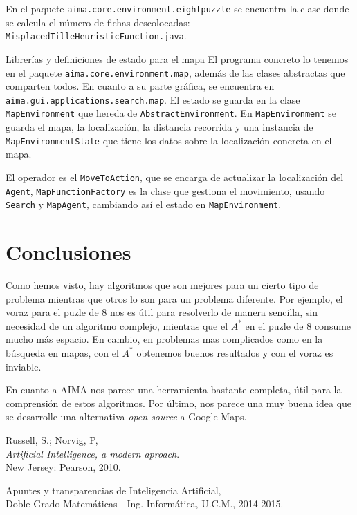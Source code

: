 \documentclass[11pt, a4paper, spanish, openright, twoside]{book}
\begin{document}
En el paquete \texttt{aima.core.environment.eightpuzzle} se encuentra la clase donde se calcula el número de fichas descolocadas: \texttt{MisplacedTilleHeuristicFunction.java}.



\begin{section}{Librerías y definiciones de estado para el mapa }
	El programa concreto lo tenemos en el paquete \texttt{aima.core.environment.map}, además de las clases abstractas que comparten todos. En cuanto a su parte gráfica, se encuentra en \texttt{aima.gui.applications.search.map}. El estado se guarda en la clase 
	\texttt{MapEnvironment} que hereda de \texttt{AbstractEnvironment}. En \texttt{MapEnvironment} se guarda el mapa, la localización, la distancia recorrida y una instancia de \texttt{MapEnvironmentState} que tiene los datos sobre la localización concreta en el mapa.
	
	El operador es el \texttt{MoveToAction}, que se encarga de actualizar la localización del \texttt{Agent}, \texttt{MapFunctionFactory} es la clase que gestiona el movimiento, usando \texttt{Search} y \texttt{MapAgent}, cambiando así el estado en \texttt{MapEnvironment}.

\end{section}

	
\section{Conclusiones}

Como hemos visto, hay algoritmos que son mejores para un cierto tipo de problema mientras que otros lo son para un problema diferente. Por ejemplo, el voraz para el puzle de 8 nos es útil para resolverlo de manera sencilla, sin necesidad de un algoritmo complejo, mientras que el $A^*$ en el puzle de 8 consume mucho más espacio. En cambio, en problemas mas complicados como en la búsqueda en mapas, con el $A^*$ obtenemos buenos resultados y con el voraz es inviable.

En cuanto a AIMA nos parece una herramienta bastante completa, útil para la comprensión de estos algoritmos. Por último, nos parece una muy buena idea que se desarrolle una alternativa \textit{open source} a Google Maps.

	
\begin{thebibliography}{9}

	Russell, S.; Norvig, P, \\
	\emph{Artificial Intelligence, a modern aproach}.\\
	New Jersey: Pearson, 2010.
	
	Apuntes y transparencias de Inteligencia Artificial, \\
	Doble Grado Matemáticas - Ing. Informática, U.C.M., 2014-2015.

\end{thebibliography}
\end{document}
